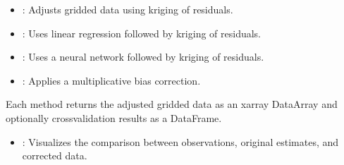 \documentclass[letterpaper,10pt,english]{sphinxmanual}
\begin{document}
\sphinxAtStartPar
{}
\begin{itemize}
\item {} 
\sphinxAtStartPar
{}: Adjusts gridded data using kriging of residuals.

\item {} 
\sphinxAtStartPar
{}: Uses linear regression followed by kriging of residuals.

\item {} 
\sphinxAtStartPar
{}: Uses a neural network followed by kriging of residuals.

\item {} 
\sphinxAtStartPar
{}: Applies a multiplicative bias correction.

\end{itemize}

\sphinxAtStartPar
Each method returns the adjusted gridded data as an xarray DataArray and optionally cross\sphinxhyphen{}validation results as a DataFrame.
\begin{itemize}
\item {} 
\sphinxAtStartPar
{}: Visualizes the comparison between observations, original estimates, and corrected data.

\end{itemize}

\sphinxAtStartPar
{}
\end{document}
